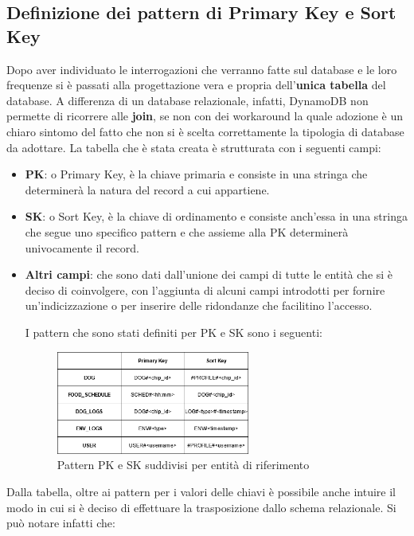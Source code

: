     \subsection{Definizione dei pattern di Primary Key e Sort Key}
    Dopo aver individuato le interrogazioni che verranno fatte sul database e le loro frequenze si è passati alla progettazione vera e propria dell'\textbf{unica tabella} del database. A differenza di un database relazionale, infatti, DynamoDB non permette di ricorrere alle \textbf{join}, se non con dei workaround la quale adozione è un chiaro sintomo del fatto che non si è scelta correttamente la tipologia di database da adottare. 
    La tabella che è stata creata è strutturata con i seguenti campi:
\begin{itemize}
    \item \textbf{PK}: o Primary Key, è la chiave primaria e consiste in una stringa che determinerà la natura del record a cui appartiene. 
    \item \textbf{SK}: o Sort Key, è la chiave di ordinamento e consiste anch'essa in una stringa che segue uno specifico pattern e che assieme alla PK determinerà univocamente il record.
    \item \textbf{Altri campi}: che sono dati dall'unione dei campi di tutte le entità che si è deciso di coinvolgere, con l'aggiunta di alcuni campi introdotti per fornire un'indicizzazione o per inserire delle ridondanze che facilitino l'accesso.
    
    I pattern che sono stati definiti per PK e SK sono i seguenti:
        \begin{figure}[H]
        \caption{Pattern PK e SK suddivisi per entità di riferimento}
        \label{fig:KeyPattern}
        \centering
        \includegraphics[width=0.6\textwidth]{DrawIo/KeysPattern.png}
    \end{figure}
\end{itemize}
    Dalla tabella, oltre ai pattern per i valori delle chiavi è possibile anche intuire il modo in cui si è deciso di effettuare la trasposizione dallo schema relazionale. Si può notare infatti che:
